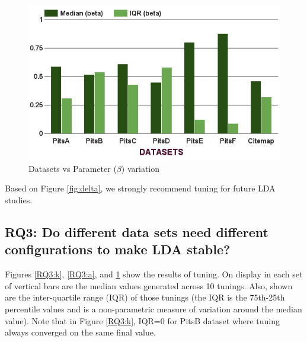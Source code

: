 \documentclass[10pt,conference]{IEEEtran}
\theoremstyle{break}
\begin{document}
\begin{figure}[!htbp]
\begin{minipage}{.33\textwidth}
        \includegraphics[width=\linewidth]{./fig/Parameters_variation_b.png}
        \caption{Datasets vs Parameter ($\beta$) variation}
        \label{RQ3:b}
    \end{minipage}
\vspace{-0.5cm}
\end{figure}

\begin{lesson}
Based on Figure \ref{fig:delta}, we strongly recommend tuning for future LDA studies.
\end{lesson}


%  
  

\subsection{\textbf{RQ3: Do different data sets
      need different configurations to make LDA stable?}}

Figures \ref{RQ3:k}, \ref{RQ3:a}, and \ref{RQ3:b} show the results of tuning.
On display in each set of vertical bars are
the median values generated across 10 tunings.
Also, shown are
the inter-quartile range (IQR) of those tunings (the IQR is the 75th-25th percentile values and is a non-parametric measure of variation
around the median value). Note that in Figure \ref{RQ3:k}, IQR=0 for  PitsB dataset where tuning
          always converged on the same final value.
\end{document}

